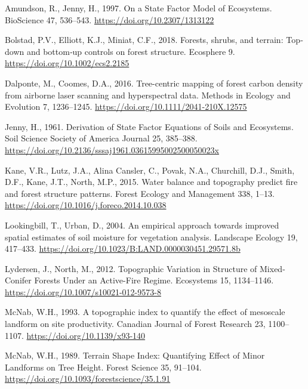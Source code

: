 \documentclass[
  12pt,
]{article}
\newlength{\cslhangindent}
\newlength{\cslentryspacingunit} %
\newenvironment{CSLReferences}[2] %
 {%
  \setlength{\parindent}{0pt}
  \ifodd #1
  \let\oldpar\par
  \def\par{\hangindent=\cslhangindent\oldpar}
  \fi
  \setlength{\parskip}{#2\cslentryspacingunit}
 }%
 {}
\begin{document}
\hypertarget{refs}{}
\begin{CSLReferences}{1}{0}
\leavevmode{}%
Amundson, R., Jenny, H., 1997. On a {State} {Factor} {Model} of
{Ecosystems}. BioScience 47, 536--543.
\url{https://doi.org/10.2307/1313122}

\leavevmode{}%
Bolstad, P.V., Elliott, K.J., Miniat, C.F., 2018. Forests, shrubs, and
terrain: Top‐down and bottom‐up controls on forest structure. Ecosphere
9. \url{https://doi.org/10.1002/ecs2.2185}

\leavevmode{}%
Dalponte, M., Coomes, D.A., 2016. Tree-centric mapping of forest carbon
density from airborne laser scanning and hyperspectral data. Methods in
Ecology and Evolution 7, 1236--1245.
\url{https://doi.org/10.1111/2041-210X.12575}

\leavevmode{}%
Jenny, H., 1961. Derivation of {State} {Factor} {Equations} of {Soils}
and {Ecosystems}. Soil Science Society of America Journal 25, 385--388.
\url{https://doi.org/10.2136/sssaj1961.03615995002500050023x}

\leavevmode{}%
Kane, V.R., Lutz, J.A., Alina Cansler, C., Povak, N.A., Churchill, D.J.,
Smith, D.F., Kane, J.T., North, M.P., 2015. Water balance and topography
predict fire and forest structure patterns. Forest Ecology and
Management 338, 1--13.
\url{https://doi.org/10.1016/j.foreco.2014.10.038}

\leavevmode{}%
Lookingbill, T., Urban, D., 2004. An empirical approach towards improved
spatial estimates of soil moisture for vegetation analysis. Landscape
Ecology 19, 417--433.
\url{https://doi.org/10.1023/B:LAND.0000030451.29571.8b}

\leavevmode{}%
Lydersen, J., North, M., 2012. Topographic {Variation} in {Structure} of
{Mixed}-{Conifer} {Forests} {Under} an {Active}-{Fire} {Regime}.
Ecosystems 15, 1134--1146.
\url{https://doi.org/10.1007/s10021-012-9573-8}

\leavevmode{}%
McNab, W.H., 1993. A topographic index to quantify the effect of
mesoscale landform on site productivity. Canadian Journal of Forest
Research 23, 1100--1107. \url{https://doi.org/10.1139/x93-140}

\leavevmode{}%
McNab, W.H., 1989. Terrain {Shape} {Index}: {Quantifying} {Effect} of
{Minor} {Landforms} on {Tree} {Height}. Forest Science 35, 91--104.
\url{https://doi.org/10.1093/forestscience/35.1.91}

\end{CSLReferences}
\end{document}
